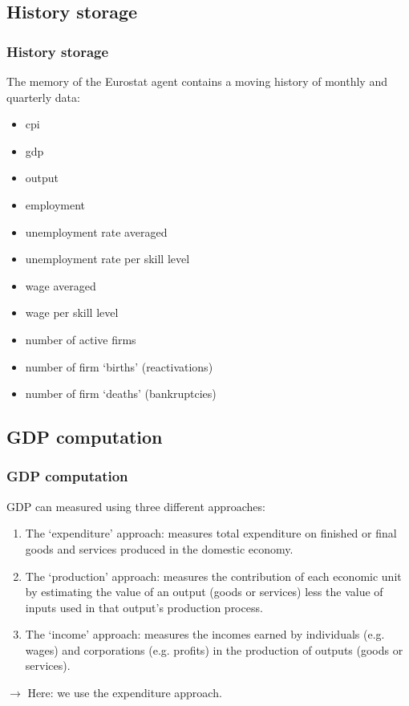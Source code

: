 \documentclass{beamer}
\begin{document}
\subsection{History storage}
\begin{frame}{}
\frametitle{History storage}
The memory of the Eurostat agent contains a moving history of monthly and quarterly data:
\begin{itemize}
\item cpi
\item gdp
\item output
\item employment
\item unemployment rate averaged
\item unemployment rate per skill level
\item wage averaged
\item wage per skill level
\item number of active firms
\item number of firm `births' (reactivations)
\item number of firm `deaths' (bankruptcies)
\end{itemize}
\end{frame}


\subsection{GDP computation}
\begin{frame}{}
\frametitle{GDP computation}
GDP can measured using three different approaches:
\begin{enumerate}
\item The `expenditure' approach: measures total expenditure on finished or final goods and services produced in the domestic economy.

\item The `production' approach: measures the contribution of each economic unit by estimating the value of an output (goods or services) less the value of inputs used in that output's production process.

\item The `income' approach: measures the incomes earned by individuals (e.g. wages) and corporations (e.g. profits) in the production of outputs (goods or services).
\end{enumerate}

$\rightarrow$ Here: we use the expenditure approach.
\end{frame}
\end{document}
